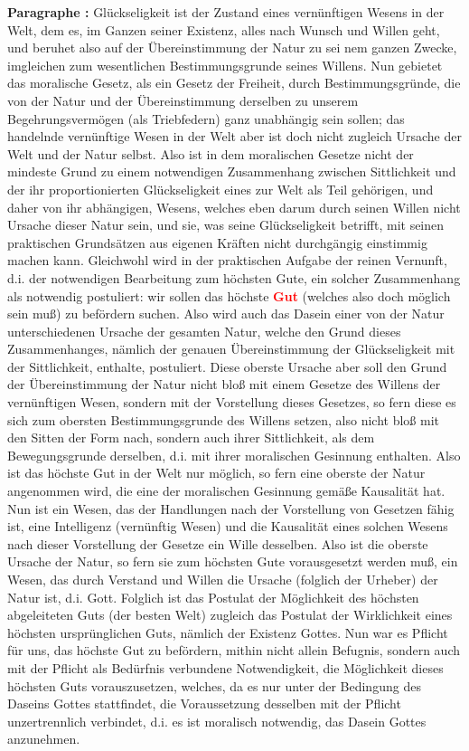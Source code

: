 \documentclass[a4paper,12pt,twoside]{book}
\newcommand{\match}[1]{\textcolor{red}{\textbf{#1}}}
\begin{document}
	\noindent\textbf{Paragraphe : }
	Glückseligkeit ist der Zustand eines vernünftigen Wesens in der Welt, dem es, im Ganzen seiner Existenz, alles nach Wunsch und Willen geht, und beruhet also auf der Übereinstimmung der Natur zu sei nem ganzen Zwecke, imgleichen zum wesentlichen Bestimmungsgrunde seines Willens. Nun gebietet das moralische Gesetz, als ein Gesetz der Freiheit, durch Bestimmungsgründe, die von der Natur und der Übereinstimmung derselben zu unserem Begehrungsvermögen (als Triebfedern) ganz unabhängig sein sollen; das handelnde vernünftige Wesen in der Welt aber ist doch nicht zugleich Ursache der Welt und der Natur selbst. Also ist in dem moralischen Gesetze nicht der mindeste Grund zu einem notwendigen Zusammenhang zwischen Sittlichkeit und der ihr proportionierten Glückseligkeit eines zur Welt als Teil gehörigen, und daher von ihr abhängigen, Wesens, welches eben darum durch seinen Willen nicht Ursache dieser Natur sein, und sie, was seine Glückseligkeit betrifft, mit seinen praktischen Grundsätzen aus eigenen Kräften nicht durchgängig einstimmig machen kann. Gleichwohl wird in der praktischen Aufgabe der reinen Vernunft, d.i. der notwendigen Bearbeitung zum höchsten Gute, ein solcher Zusammenhang als notwendig postuliert: wir sollen das höchste \match{Gut} (welches also doch möglich sein muß) zu befördern suchen. Also wird auch das Dasein einer von der Natur unterschiedenen Ursache der gesamten Natur, welche den Grund dieses Zusammenhanges, nämlich der genauen Übereinstimmung der Glückseligkeit mit der Sittlichkeit, enthalte, postuliert. Diese oberste Ursache aber soll den Grund der Übereinstimmung der Natur nicht bloß mit einem Gesetze des Willens der vernünftigen Wesen, sondern  mit der Vorstellung dieses Gesetzes, so fern diese es sich zum obersten Bestimmungsgrunde des Willens setzen, also nicht bloß mit den Sitten der Form nach, sondern auch ihrer Sittlichkeit, als dem Bewegungsgrunde derselben, d.i. mit ihrer moralischen Gesinnung enthalten. Also ist das höchste Gut in der Welt nur möglich, so fern eine oberste der Natur angenommen wird, die eine der moralischen Gesinnung gemäße Kausalität hat. Nun ist ein Wesen, das der Handlungen nach der Vorstellung von Gesetzen fähig ist, eine Intelligenz (vernünftig Wesen) und die Kausalität eines solchen Wesens nach dieser Vorstellung der Gesetze ein Wille desselben. Also ist die oberste Ursache der Natur, so fern sie zum höchsten Gute vorausgesetzt werden muß, ein Wesen, das durch Verstand und Willen die Ursache (folglich der Urheber) der Natur ist, d.i. Gott. Folglich ist das Postulat der Möglichkeit des höchsten abgeleiteten Guts (der besten Welt) zugleich das Postulat der Wirklichkeit eines höchsten ursprünglichen Guts, nämlich der Existenz Gottes. Nun war es Pflicht für uns, das höchste Gut zu befördern, mithin nicht allein Befugnis, sondern auch mit der Pflicht als Bedürfnis verbundene Notwendigkeit, die Möglichkeit dieses höchsten Guts vorauszusetzen, welches, da es nur unter der Bedingung des Daseins Gottes stattfindet, die Voraussetzung desselben mit der Pflicht unzertrennlich verbindet, d.i. es ist moralisch notwendig, das Dasein Gottes anzunehmen. 
	
\end{document}
